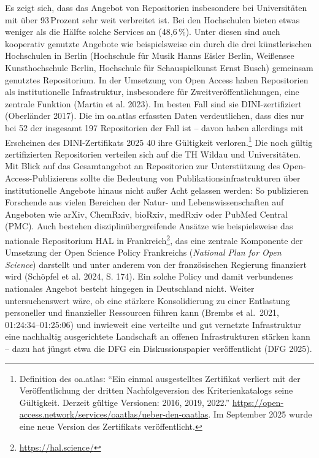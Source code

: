 \documentclass[a4paper,
fontsize=11pt,
oneside,
numbers=noperiodatend,
parskip=half-,
bibliography=totoc,
final
]{scrartcl}
\begin{document}
Es zeigt sich, dass das Angebot von Repositorien insbesondere bei
Universitäten mit über 93\,Pro\-zent sehr weit verbreitet ist. Bei den
Hochschulen bieten etwas weniger als die Hälfte solche Services an
(48,6\,\%). Unter diesen sind auch kooperativ genutzte Angebote wie
beispielsweise ein durch die drei künstlerischen Hochschulen in Berlin
(Hochschule für Musik Hanns Eisler Berlin, Weißensee Kunsthochschule
Berlin, Hochschule für Schauspielkunst Ernst Busch) gemeinsam genutztes
Repositorium. In der Umsetzung von Open Access haben Repositorien als
institutionelle Infrastruktur, insbesondere für Zweitveröffentlichungen,
eine zentrale Funktion (Martin et al. 2023). Im besten Fall sind sie
DINI-zertifiziert (Oberländer 2017). Die im oa.atlas erfassten Daten
verdeutlichen, dass dies nur bei 52 der insgesamt 197 Repositorien der
Fall ist -- davon haben allerdings mit Erscheinen des DINI-Zertifikats 2025 40 ihre
Gültigkeit verloren.\footnote{Definition des oa.atlas: \enquote{Ein
  einmal ausgestelltes Zertifikat verliert mit der Veröffentlichung der
  dritten Nachfolgeversion des Kriterienkatalogs seine Gültigkeit.
  Derzeit gültige Versionen: 2016, 2019, 2022.}
  \url{https://open-access.network/services/oaatlas/ueber-den-oaatlas}. Im September 2025 wurde eine neue Version des Zertifikats veröffentlicht.}
Die noch gültig zertifizierten Repositorien verteilen sich auf die TH Wildau und Universitäten. Mit
Blick auf das Gesamtangebot an Repositorien zur Unterstützung des
Open-Access-Publizierens sollte die Bedeutung von
Publikationsinfrastrukturen über institutionelle Angebote hinaus nicht
außer Acht gelassen werden: So publizieren Forschende aus vielen
Bereichen der Natur- und Lebenswissenschaften auf Angeboten wie arXiv,
ChemRxiv, bioRxiv, medRxiv oder PubMed Central (PMC). Auch bestehen
disziplinübergreifende Ansätze wie beispielsweise das nationale
Repositorium HAL in Frankreich\footnote{\url{https://hal.science/}}, das
eine zentrale Komponente der Umsetzung der Open Science Policy
Frankreichs (\emph{National Plan for Open Science}) darstellt und unter
anderem von der französischen Regierung finanziert wird (Schöpfel et
al. 2024, S. 174). Ein solche Policy und damit verbundenes nationales
Angebot besteht hingegen in Deutschland nicht. Weiter untersuchenswert
wäre, ob eine stärkere Konsolidierung zu einer Entlastung personeller
und finanzieller Ressourcen führen kann (Brembs et al.~2021, 01:24:34--01:25:06) und inwieweit
eine verteilte und gut vernetzte Infrastruktur eine nachhaltig
ausgerichtete Landschaft an offenen Infrastrukturen stärken kann -- dazu
hat jüngst etwa die DFG ein Diskussionspapier veröffentlicht (DFG 2025).
\end{document}
